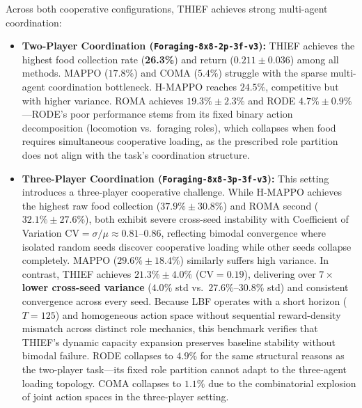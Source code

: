 Across both cooperative configurations, THIEF achieves strong multi-agent coordination:
\begin{itemize}[leftmargin=*,nosep]
    \item \textbf{Two-Player Coordination (\texttt{Foraging-8x8-2p-3f-v3}):} THIEF achieves the highest food collection rate (\textbf{26.3\%}) and return ($0.211 \pm 0.036$) among all methods. MAPPO ($17.8\%$) and COMA ($5.4\%$) struggle with the sparse multi-agent coordination bottleneck. H-MAPPO reaches $24.5\%$, competitive but with higher variance. ROMA achieves $19.3\% \pm 2.3\%$ and RODE $4.7\% \pm 0.9\%$---RODE's poor performance stems from its fixed binary action decomposition (locomotion vs.\ foraging roles), which collapses when food requires simultaneous cooperative loading, as the prescribed role partition does not align with the task's coordination structure.
    \item \textbf{Three-Player Coordination (\texttt{Foraging-8x8-3p-3f-v3}):} This setting introduces a three-player cooperative challenge. While H-MAPPO achieves the highest raw food collection ($37.9\% \pm 30.8\%$) and ROMA second ($32.1\% \pm 27.6\%$), both exhibit severe cross-seed instability with Coefficient of Variation $\text{CV} = \sigma / \mu \approx 0.81$--$0.86$, reflecting bimodal convergence where isolated random seeds discover cooperative loading while other seeds collapse completely. MAPPO ($29.6\% \pm 18.4\%$) similarly suffers high variance. In contrast, THIEF achieves $21.3\% \pm 4.0\%$ ($\text{CV} = 0.19$), delivering over \textbf{$7\times$ lower cross-seed variance} ($4.0\%$ std vs.\ $27.6\%$--$30.8\%$ std) and consistent convergence across every seed. Because LBF operates with a short horizon ($T = 125$) and homogeneous action space without sequential reward-density mismatch across distinct role mechanics, this benchmark verifies that THIEF's dynamic capacity expansion preserves baseline stability without bimodal failure. RODE collapses to $4.9\%$ for the same structural reasons as the two-player task---its fixed role partition cannot adapt to the three-agent loading topology. COMA collapses to $1.1\%$ due to the combinatorial explosion of joint action spaces in the three-player setting.
\end{itemize}

\FloatBarrier
